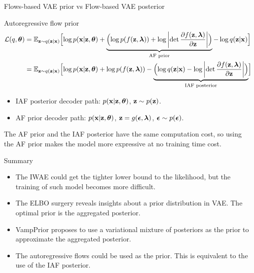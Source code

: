 \begin{frame}{Flows-based VAE prior vs Flow-based VAE posterior}
	\begin{block}{Autoregressive flow prior}
		{\footnotesize
		\begin{align*}
			\mathcal{L}(q, \boldsymbol{\theta}) &= \mathbb{E}_{\mathbf{z} \sim q(\mathbf{z} | \mathbf{x})} \Bigl[ \log p(\mathbf{x} | \mathbf{z}, \boldsymbol{\theta}) + \underbrace{ \Bigl( \log p(f(\mathbf{z}, \boldsymbol{\lambda})) + \log \left| \det \frac{\partial f(\mathbf{z}, \boldsymbol{\lambda})}{\partial \mathbf{z}} \right| \Bigr) }_{\text{AF prior}} - \log q(\mathbf{z} | \mathbf{x}) \Bigr] \\
			&= \mathbb{E}_{\mathbf{z} \sim q(\mathbf{z} | \mathbf{x})} \Bigl[ \log p(\mathbf{x} | \mathbf{z}, \boldsymbol{\theta}) +  \log p(f(\mathbf{z}, \boldsymbol{\lambda})) - \underbrace{ \Bigl( \log q(\mathbf{z} | \mathbf{x}) - \log \left| \det \frac{\partial f(\mathbf{z}, \boldsymbol{\lambda})}{\partial \mathbf{z}} \right| \Bigr) }_{\text{IAF posterior}} \Bigr]
		\end{align*}
		}
	\end{block}
	\begin{itemize}
		\item IAF posterior decoder path: $p(\mathbf{x}|\mathbf{z}, \boldsymbol{\theta})$, $\mathbf{z} \sim p(\mathbf{z})$.
		\item AF prior decoder path: $p(\mathbf{x}|\mathbf{z}, \boldsymbol{\theta})$, $\mathbf{z} = g(\boldsymbol{\epsilon}, \boldsymbol{\lambda})$, $\boldsymbol{\epsilon} \sim p(\boldsymbol{\epsilon})$. 
	\end{itemize}
	The AF prior and the IAF posterior have the same computation cost, so using the AF prior makes the model more expressive at no training time cost.

\end{frame}
\begin{frame}{Summary}
	\begin{itemize}
		\item The IWAE could get the tighter lower bound to the likelihood, but the training of such model becomes more difficult.
		\vfill
		\item The ELBO surgery reveals insights about a prior distribution in VAE. The optimal prior is the aggregated posterior.
		\vfill
		\item VampPrior proposes to use a variational mixture of posteriors as the prior to approximate the aggregated posterior.
		\vfill
		\item The autoregressive flows could be used as the prior. This is equivalent to the use of the IAF posterior. 
	\end{itemize}
\end{frame}

 